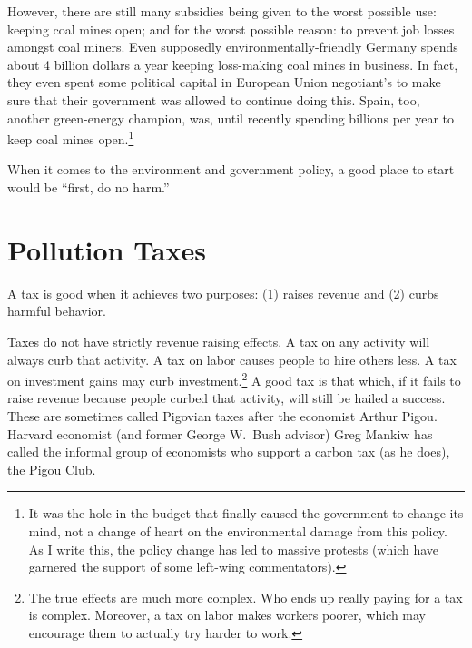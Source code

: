 
However, there are still many subsidies being given to the worst possible use:
keeping coal mines open; and for the worst possible reason: to prevent job
losses amongst coal miners. Even supposedly environmentally-friendly Germany
spends about 4 billion dollars a year keeping loss-making coal mines in
business. In fact, they even spent some political capital in European Union
negotiant's to make sure that their government was allowed to continue doing
this. Spain, too, another green-energy champion, was, until recently spending
billions per year to keep coal mines open.\footnote{It was the hole in the
budget that finally caused the government to change its mind, not a change of
heart on the environmental damage from this policy. As I write this, the policy
change has led to massive protests (which have garnered the support of some
left-wing commentators).}

When it comes to the environment and government policy, a good place to start
would be ``first, do no harm.''


\section{Pollution Taxes}

A tax is good when it achieves two purposes: (1) raises revenue and (2) curbs
harmful behavior.

Taxes do not have strictly revenue raising effects. A tax on any activity will
always curb that activity. A tax on labor causes people to hire others
less. A tax on investment gains may curb investment.\footnote{The true effects
are much more complex. Who ends up really paying for a tax is complex.
Moreover, a tax on labor makes workers poorer, which may encourage them to
actually try harder to work.} A good tax is that which, if it fails to raise
revenue because people curbed that activity, will still be hailed a success.
These are sometimes called Pigovian taxes after the economist Arthur Pigou.
Harvard economist (and former George W.\ Bush advisor) Greg Mankiw has called
the informal group of economists who support a carbon tax (as he does), the
Pigou Club.

